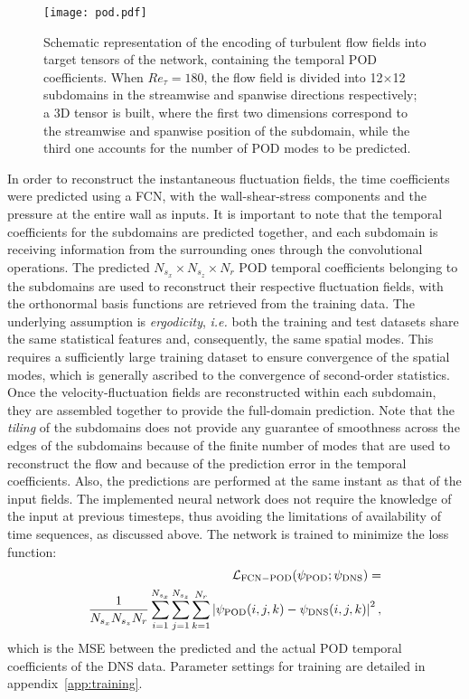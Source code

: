 \begin{figure}
    \centerline{\texttt{[image: pod.pdf]}}
    \caption{Schematic representation of the encoding of turbulent flow fields into target tensors of the network, containing the temporal POD coefficients. When $Re_\tau=180$, the flow field is divided into 12$\times$12 subdomains in the streamwise and spanwise directions respectively; a 3D tensor is built, where the first two dimensions correspond to the streamwise and spanwise position of the subdomain, while the third one accounts for the number of POD modes to be predicted.}
    \label{fig:uc3m02}
\end{figure}

In order to reconstruct the instantaneous fluctuation fields, the time coefficients were predicted using a FCN, with the wall-shear-stress components and the pressure at the entire wall as inputs.
It is important to note that the temporal coefficients for the subdomains are predicted together, and each subdomain is receiving information from the surrounding ones through the convolutional operations.
The predicted $N_{s_x} \times N_{s_z} \times N_r$ POD temporal coefficients belonging to the subdomains are used to reconstruct their respective fluctuation fields, with the orthonormal basis functions are retrieved from the training data.
The underlying assumption is \textit{ergodicity}, {\it i.e.} both the training and test datasets share the same statistical features and, consequently, the same spatial modes.
This requires a sufficiently large training dataset to ensure convergence of the spatial modes, which is generally ascribed to the convergence of second-order statistics.
Once the velocity-fluctuation fields are reconstructed within each subdomain, they are assembled together to provide the full-domain prediction.
Note that the \textit{tiling} of the subdomains does not provide any guarantee of smoothness across the edges of the subdomains because of the finite number of modes that are used to reconstruct the flow and because of the prediction error in the temporal coefficients.
Also, the predictions are performed at the same instant as that of the input fields.
The implemented neural network does not require the knowledge of the input at previous timesteps, thus avoiding the limitations of availability of time sequences, as discussed above.
The network is trained to minimize the loss function: %
\begin{equation}
\begin{aligned}
    \mathcal{L}_{{\rm FCN-POD}}(\psi_\mathrm{POD};\psi_\mathrm{DNS})=\\
    \frac{1}{N_{s_x} N_{s_z} N_r} \sum_{i=1}^{N_{s_x}}  \sum_{j=1}^{N_{s_z}} \sum_{k=1}^{N_r} \left | \psi_\mathrm{POD}(i,j,k) - \psi_\mathrm{DNS}(i,j,k)\right |^{2},
  \end{aligned}
\end{equation}
\noindent which is the MSE between the predicted and the actual POD temporal coefficients of the DNS data. Parameter settings for training are detailed in appendix~\ref{app:training}.

